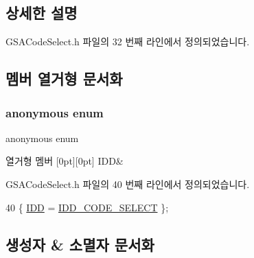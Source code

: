 \subsection{상세한 설명}


G\+S\+A\+Code\+Select.\+h 파일의 32 번째 라인에서 정의되었습니다.



\subsection{멤버 열거형 문서화}
\mbox{\label{class_g_s_a_code_select_a248fc16f816d8ee4cc8e8e16f71a0167}} 
\subsubsection{\texorpdfstring{anonymous enum}{anonymous enum}}
{\footnotesize\ttfamily anonymous enum}

\begin{DoxyEnumFields}{열거형 멤버}
[0pt][0pt]{}\mbox{\label{class_g_s_a_code_select_a248fc16f816d8ee4cc8e8e16f71a0167acbcc533e23047c863f6466b3b84f499a}} 
I\+DD&\\
\hline

\end{DoxyEnumFields}


G\+S\+A\+Code\+Select.\+h 파일의 40 번째 라인에서 정의되었습니다.


\begin{DoxyCode}
40 \{ \mbox{\hyperlink{class_g_s_a_code_select_a248fc16f816d8ee4cc8e8e16f71a0167acbcc533e23047c863f6466b3b84f499a}{IDD}} = \mbox{\hyperlink{resource_8h_a7f651873ca7b98d5e9d9ef78081ba516}{IDD\_CODE\_SELECT}} \};
\end{DoxyCode}


\subsection{생성자 \& 소멸자 문서화}
\mbox{\label{class_g_s_a_code_select_abe2d23afcbf2fe70e2aaf6ced96c9b1c}} 
